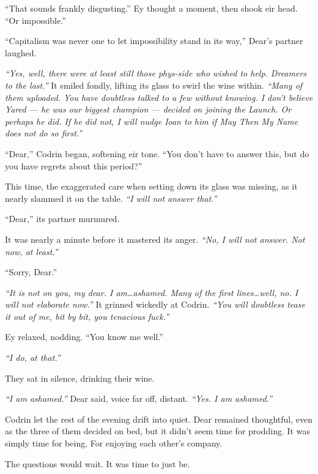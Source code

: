 ``That sounds frankly disgusting.'' Ey thought a moment, then shook eir head. ``Or impossible.''

``Capitalism was never one to let impossibility stand in its way,'' Dear's partner laughed.

\emph{``Yes, well, there were at least still those phys-side who wished to help. Dreamers to the last.''} It smiled fondly, lifting its glass to swirl the wine within. \emph{``Many of them uploaded. You have doubtless talked to a few without knowing. I don't believe Yared — he was our biggest champion — decided on joining the Launch. Or perhaps he did. If he did not, I will nudge Ioan to him if May Then My Name does not do so first.''}

``Dear,'' Codrin began, softening eir tone. ``You don't have to answer this, but do you have regrets about this period?''

This time, the exaggerated care when setting down its glass was missing, as it nearly slammed it on the table. \emph{``I will not answer that.''}

``Dear,'' its partner murmured.

It was nearly a minute before it mastered its anger. \emph{``No, I will not answer. Not now, at least.''}

``Sorry, Dear.''

\emph{``It is not on you, my dear. I am\ldots ashamed. Many of the first lines\ldots well, no. I will not elaborate now.''} It grinned wickedly at Codrin. \emph{``You will doubtless tease it out of me, bit by bit, you tenacious fuck.''}

Ey relaxed, nodding. ``You know me well.''

\emph{``I do, at that.''}

They sat in silence, drinking their wine.

\emph{``I am ashamed.''} Dear said, voice far off, distant. \emph{``Yes. I am ashamed.''}

Codrin let the rest of the evening drift into quiet. Dear remained thoughtful, even as the three of them decided on bed, but it didn't seem time for prodding. It was simply time for being. For enjoying each other's company.

The questions would wait. It was time to just be.
